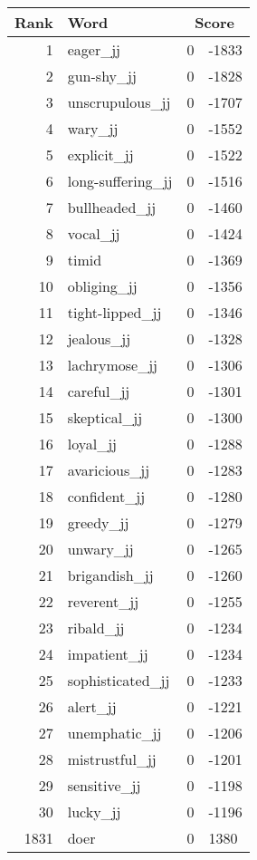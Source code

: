 \begin{longtable}[!htbp]{| rlr@{.}l |}
    \hline
    \textbf{Rank} & \textbf{Word} & \multicolumn{2}{c|}{\textbf{Score}} \\
    \hline
    \endhead
    1 & eager\_jj & 0 & -1833 \\
    2 & gun-shy\_jj & 0 & -1828 \\
    3 & unscrupulous\_jj & 0 & -1707 \\
    4 & wary\_jj & 0 & -1552 \\
    5 & explicit\_jj & 0 & -1522 \\
    6 & long-suffering\_jj & 0 & -1516 \\
    7 & bullheaded\_jj & 0 & -1460 \\
    8 & vocal\_jj & 0 & -1424 \\
    9 & timid & 0 & -1369 \\
    10 & obliging\_jj & 0 & -1356 \\
    11 & tight-lipped\_jj & 0 & -1346 \\
    12 & jealous\_jj & 0 & -1328 \\
    13 & lachrymose\_jj & 0 & -1306 \\
    14 & careful\_jj & 0 & -1301 \\
    15 & skeptical\_jj & 0 & -1300 \\
    16 & loyal\_jj & 0 & -1288 \\
    17 & avaricious\_jj & 0 & -1283 \\
    18 & confident\_jj & 0 & -1280 \\
    19 & greedy\_jj & 0 & -1279 \\
    20 & unwary\_jj & 0 & -1265 \\
    21 & brigandish\_jj & 0 & -1260 \\
    22 & reverent\_jj & 0 & -1255 \\
    23 & ribald\_jj & 0 & -1234 \\
    24 & impatient\_jj & 0 & -1234 \\
    25 & sophisticated\_jj & 0 & -1233 \\
    26 & alert\_jj & 0 & -1221 \\
    27 & unemphatic\_jj & 0 & -1206 \\
    28 & mistrustful\_jj & 0 & -1201 \\
    29 & sensitive\_jj & 0 & -1198 \\
    30 & lucky\_jj & 0 & -1196 \\
    1831 & doer & 0 & 1380 \\

\end{longtable}
